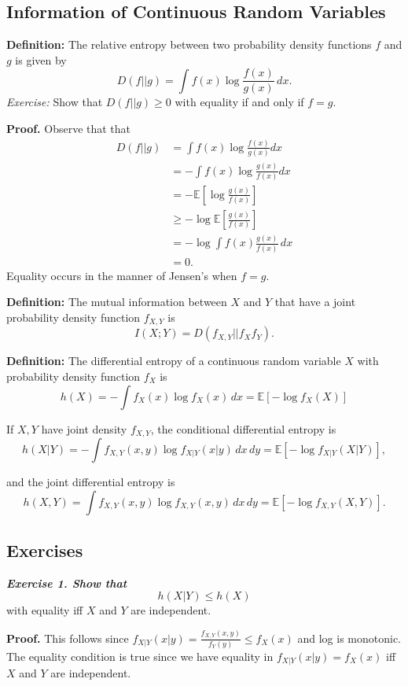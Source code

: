 \documentclass[13pt]{article}
\begin{document}
\subsection{Information of Continuous Random Variables}
\textbf{Definition:} The relative entropy between two probability density functions $f$ and $g$ is given by
\[
D(f||g) = \int f(x) \log \frac{f(x)}{g(x)} \, dx.
\]
{\it Exercise:} Show that $D(f||g) \geq 0$ with equality if and only if $f = g$.

\textbf{Proof.} Observe that that
\begin{align*}
D(f||g)&=\int f(x)\log\frac{f(x)}{g(x)}dx\\
&=-\int f(x)\log\frac{g(x)}{f(x)}dx\\
&=-\mathbb{E}\left [\log\frac{g(x)}{f(x)} \right]\\
&\geq-\log\mathbb{E}\left [\frac{g(x)}{f(x)} \right ]\\
&=-\log\int f(x)\frac{g(x)}{f(x)} \, dx \\
&=0.
\end{align*}
Equality occurs in the manner of Jensen's when $f=g.$

\textbf{Definition:} The mutual information between $X$ and $Y$ that have a joint probability density function $f_{X, Y}$ is
\[
I(X; Y) = D(f_{X, Y} || f_X f_Y).
\]

\textbf{Definition:} The differential entropy of a continuous random variable $X$ with probability density function $f_X$ is
\[
h(X) = - \int f_X(x) \log f_X(x) \, dx = \mathbb{E} \left [ - \log f_X(X) \right ]
\]

If $X, Y$ have joint density $f_{X, Y}$, the conditional differential entropy is
\[
h(X|Y) = - \int f_{X, Y} (x, y) \log f_{X|Y} (x|y) \, dx \, dy = \mathbb{E} [ - \log f_{X|Y} (X|Y)],
\]

and the joint differential entropy is
\[
h(X, Y) = \int f_{X, Y} (x, y) \log f_{X, Y} (x, y) \, dx \, dy = \mathbb{E} [- \log f_{X, Y} (X, Y)].
\]

\subsection{Exercises}
\textbf{\textit{Exercise 1.  Show that}}
\[
h(X | Y ) \leq h(X)
\]
with equality iff $X$ and $Y$ are independent.

\textbf{Proof.} This follows since $f_{X|Y}(x|y)=\frac{f_{X,Y}(x,y)}{f_{Y}(y)}\leq f_X(x)$ and log is monotonic. The equality condition is true since we have equality in $f_{X|Y}(x|y)=f_X(x)$ iff $X$ and $Y$ are independent.
\end{document}
